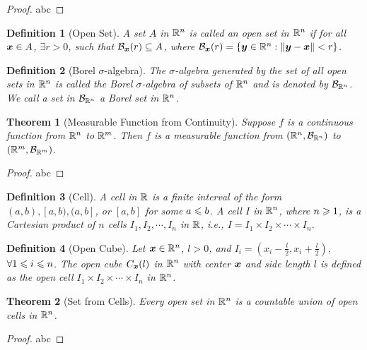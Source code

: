 \documentclass[openany,12pt]{book}
\newtheorem{theorem}{Theorem}[chapter]
\newtheorem{definition}{Definition}[chapter]
\begin{document}
\begin{proof}
  abc
\end{proof}

\begin{definition}[Open Set]
  A set $A$ in $\mathbb{R}^n$ is called an open set in $\mathbb{R}^n$ if for all $\bm{x}\in A$, $\exists r>0$, such that $\mathcal{B}_{\bm{x}}(r)\subseteq A$, where $\mathcal{B}_{\bm{x}}(r)=\{\bm{y}\in\mathbb{R}^n:\Arrowvert\bm{y}-\bm{x}\Arrowvert<r\}$.
\end{definition}

\begin{definition}[Borel $\sigma$-algebra]
  The $\sigma$-algebra generated by the set of all open sets in $\mathbb{R}^n$ is called the Borel $\sigma$-algebra of subsets of $\mathbb{R}^n$ and is denoted by $\mathcal{B}_{\mathbb{R}^n}$. We call a set in $\mathcal{B}_{\mathbb{R}^n}$ a Borel set in $\mathbb{R}^n$.
\end{definition}

\begin{theorem}[Measurable Function from Continuity]
  Suppose $f$ is a continuous function from $\mathbb{R}^n$ to $\mathbb{R}^m$. Then $f$ is a measurable function from $(\mathbb{R}^n,\mathcal{B}_{\mathbb{R}^n})$ to $(\mathbb{R}^m,\mathcal{B}_{\mathbb{R}^m})$.
\end{theorem}

\begin{proof}
  abc
\end{proof}

\begin{definition}[Cell]
  A cell in $\mathbb{R}$ is a finite interval of the form $(a,b),[a,b),(a,b]$, or $[a,b]$ for some $a\leqslant b$. A cell $I$ in $\mathbb{R}^n$, where $n\geqslant1$, is a Cartesian product of $n$ cells $I_1,I_2, \cdots,I_n$ in $\mathbb{R}$, i.e., $I=I_1\times I_2\times\cdots\times I_n$.
\end{definition}

\begin{definition}[Open Cube]
  Let $\bm{x}\in\mathbb{R}^n$, $l>0$, and $I_i=\left(x_i-\frac{l}{2},x_i+\frac{l}{2}\right)$,$\forall1\leqslant i\leqslant n$. The open cube $C_{\bm{x}}(l)$ in $\mathbb{R}^n$ with center $\bm{x}$ and side length $l$ is defined as the open cell $I_1\times I_2\times\cdots\times I_n$  in $\mathbb{R}^n$.
\end{definition}

\begin{theorem}[Set from Cells]
  Every open set in $\mathbb{R}^n$ is a countable union of open cells in $\mathbb{R}^n$.
\end{theorem}

\begin{proof}
  abc
\end{proof}
\end{document}
